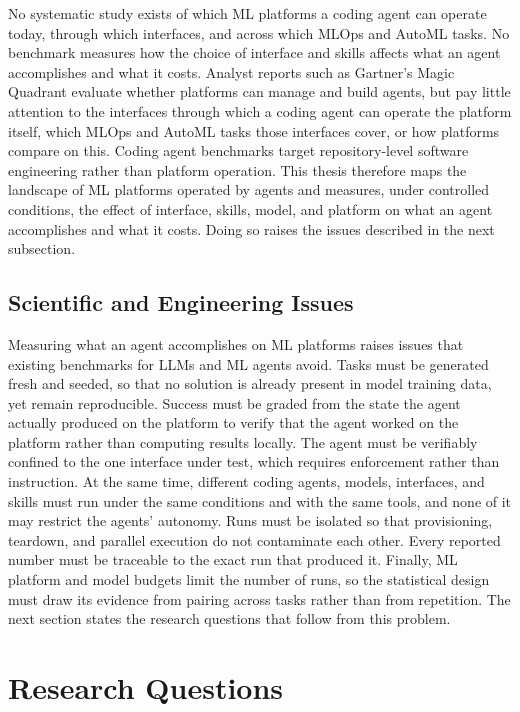 \documentclass[
english,                 %
bibtex,                  %
]{kththesis}
\numberwithin{listing}{chapter}
\begin{document}
No systematic study exists of which \gls{ML} platforms a coding agent can operate today, through which interfaces, and across which \gls{MLOps} and \gls{AutoML} tasks. No benchmark measures how the choice of interface and skills affects what an agent accomplishes and what it costs. Analyst reports such as Gartner's Magic Quadrant evaluate whether platforms can manage and build agents, but pay little attention to the interfaces through which a coding agent can operate the platform itself, which \gls{MLOps} and \gls{AutoML} tasks those interfaces cover, or how platforms compare on this. Coding agent benchmarks target repository-level software engineering rather than platform operation. This thesis therefore maps the landscape of \gls{ML} platforms operated by agents and measures, under controlled conditions, the effect of interface, skills, model, and platform on what an agent accomplishes and what it costs. Doing so raises the issues described in the next subsection.

\subsection{Scientific and Engineering Issues}
\label{sec:intro_scientific_and_engineering_issues}
\glsresetall

Measuring what an agent accomplishes on \gls{ML} platforms raises issues that existing benchmarks for \glspl{LLM} and \gls{ML} agents avoid. Tasks must be generated fresh and seeded, so that no solution is already present in model training data, yet remain reproducible. Success must be graded from the state the agent actually produced on the platform to verify that the agent worked on the platform rather than computing results locally. The agent must be verifiably confined to the one interface under test, which requires enforcement rather than instruction. At the same time, different coding agents, models, interfaces, and skills must run under the same conditions and with the same tools, and none of it may restrict the agents' autonomy. Runs must be isolated so that provisioning, teardown, and parallel execution do not contaminate each other. Every reported number must be traceable to the exact run that produced it. Finally, \gls{ML} platform and model budgets limit the number of runs, so the statistical design must draw its evidence from pairing across tasks rather than from repetition. The next section states the research questions that follow from this problem.

\section{Research Questions}
\label{sec:intro_research_questions}
\glsresetall
\end{document}
